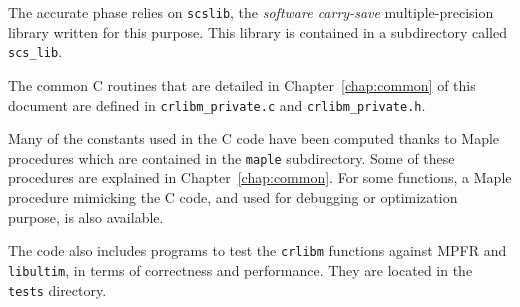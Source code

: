 The accurate phase relies on \texttt{scslib}, the \emph{software
  carry-save} multiple-precision library written for this purpose.
This library is contained in a subdirectory called \texttt{scs\_lib}.

The common C routines that are detailed in Chapter~\ref{chap:common} of
this document are defined in \texttt{crlibm\_private.c} and
\texttt{crlibm\_private.h}.

Many of the constants used in the C code have been computed thanks to
Maple procedures which are contained in the \texttt{maple}
subdirectory. Some of these procedures are explained in
Chapter~\ref{chap:common}. For some functions, a Maple procedure
mimicking the C code, and used for debugging or optimization purpose,
is also available.


The code also includes programs to test the \texttt{crlibm} functions
against MPFR and \texttt{libultim}, in terms of correctness and
performance. They are located in the \texttt{tests} directory.

